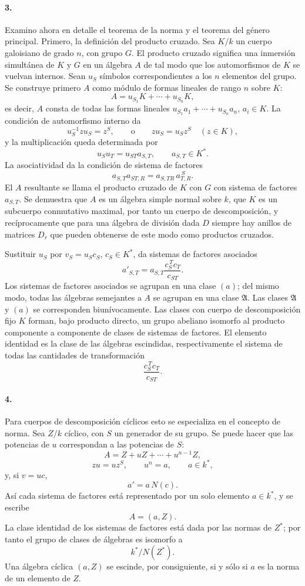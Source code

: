 \paragraph{3.}
Examino ahora en detalle el teorema de la norma y el teorema del género principal. Primero, la definición del producto cruzado. Sea \(K/k\) un cuerpo galoisiano de grado \(n\), con grupo \(G\). El producto cruzado significa una inmersión simultánea de \(K\) y \(G\) en un álgebra \(A\) de tal modo que los automorfismos de \(K\) se vuelvan internos. Sean \(u_S\) símbolos correspondientes a los \(n\) elementos del grupo. Se construye primero \(A\) como módulo de formas lineales de rango \(n\) sobre \(K\):
\[
        A=u_{S_1}K+\cdots+u_{S_n}K ,
\]
es decir, \(A\) consta de todas las formas lineales \(u_{S_1}a_1+\cdots+u_{S_n}a_n\), \(a_i\in K\). La condición de automorfismo interno da
\[
        u_S^{-1}zu_S=z^S,\qquad\text{o}\qquad
        zu_S=u_Sz^S\quad (z\in K),
\]
y la multiplicación queda determinada por
\[
        u_Su_T=u_{ST}a_{S,T},\qquad a_{S,T}\in K^* .
\]
La asociatividad da la condición de sistema de factores
\[
        a_{S,T}a_{ST,R}=a_{S,TR}\,a_{T,R}^{\,S}.
\]
El \(A\) resultante se llama el producto cruzado de \(K\) con \(G\) con sistema de factores \(a_{S,T}\). Se demuestra que \(A\) es un álgebra simple normal sobre \(k\), que \(K\) es un subcuerpo conmutativo maximal, por tanto un cuerpo de descomposición, y recíprocamente que para una álgebra de división dada \(D\) siempre hay anillos de matrices \(D_r\) que pueden obtenerse de este modo como productos cruzados.

Sustituir \(u_S\) por \(v_S=u_Sc_S\), \(c_S\in K^*\), da sistemas de factores asociados
\[
        a'_{S,T}=a_{S,T}\frac{c_S^{\,T}c_T}{c_{ST}}.
\]
Los sistemas de factores asociados se agrupan en una clase \((a)\); del mismo modo, todas las álgebras semejantes a \(A\) se agrupan en una clase \(\mathfrak A\). Las clases \(\mathfrak A\) y \((a)\) se corresponden biunívocamente. Las clases con cuerpo de descomposición fijo \(K\) forman, bajo producto directo, un grupo abeliano isomorfo al producto componente a componente de clases de sistemas de factores. El elemento identidad es la clase de las álgebras escindidas, respectivamente el sistema de todas las cantidades de transformación
\[
        \frac{c_S^{\,T}c_T}{c_{ST}}.
\]

\paragraph{4.}
Para cuerpos de descomposición cíclicos esto se especializa en el concepto de norma. Sea \(Z/k\) cíclico, con \(S\) un generador de su grupo. Se puede hacer que las potencias de \(u\) correspondan a las potencias de \(S\):
\[
        A=Z+uZ+\cdots+u^{n-1}Z,
\]
\[
        zu=uz^S,\qquad u^n=a,\qquad a\in k^*,
\]
y, si \(v=uc\),
\[
        a'=a\,N(c).
\]
Así cada sistema de factores está representado por un solo elemento \(a\in k^*\), y se escribe
\[
        A=(a,Z).
\]
La clase identidad de los sistemas de factores está dada por las normas de \(Z^*\); por tanto el grupo de clases de álgebras es isomorfo a
\[
        k^*/N(Z^*).
\]
Una álgebra cíclica \((a,Z)\) se escinde, por consiguiente, si y sólo si \(a\) es la norma de un elemento de \(Z\).

